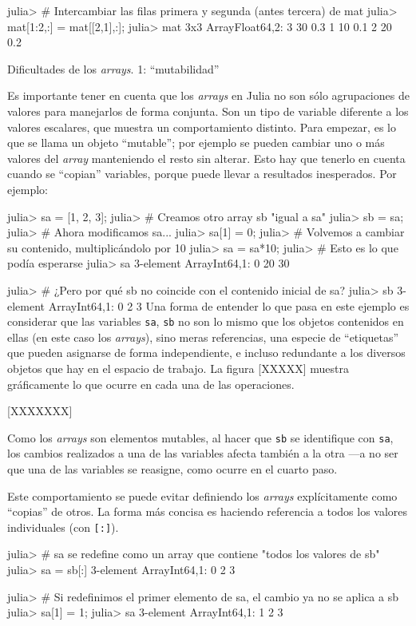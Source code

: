 ﻿\documentclass{article}
\newcommand{\code}{\texttt}
\begin{document}
julia> # Intercambiar las filas primera y segunda (antes tercera) de mat
julia> mat[1:2,:] = mat[[2,1],:];
julia> mat
3x3 Array{Float64,2}:
 3 30 0.3
 1 10 0.1
 2 20 0.2

Dificultades de los \emph{arrays}. 1: ``mutabilidad''

Es importante tener en cuenta que los \emph{arrays} en Julia no son sólo agrupaciones de valores para manejarlos de forma conjunta. Son un tipo de variable diferente a los valores escalares, que muestra un comportamiento distinto. Para empezar, es lo que se llama un objeto ``mutable''; por ejemplo se pueden cambiar uno o más valores del \emph{array} manteniendo el resto sin alterar. Esto hay que tenerlo en cuenta cuando se ``copian'' variables, porque puede llevar a resultados inesperados. Por ejemplo:

julia> sa = [1, 2, 3];
julia> # Creamos otro array sb "igual a sa"
julia> sb = sa;
julia> # Ahora modificamos sa...
julia> sa[1] = 0;
julia> # Volvemos a cambiar su contenido, multiplicándolo por 10
julia> sa = sa*10;
julia> # Esto es lo que podía esperarse
julia> sa
3-element Array{Int64,1}:
  0
 20
 30

julia> # ¿Pero por qué sb no coincide con el contenido inicial de sa?
julia> sb
3-element Array{Int64,1}:
 0
 2
 3
Una forma de entender lo que pasa en este ejemplo es considerar que las variables \code{sa}, \code{sb} no son lo mismo que los objetos contenidos en ellas (en este caso los \emph{arrays}), sino meras referencias, una especie de ``etiquetas'' que pueden asignarse de forma independiente, e incluso redundante a los diversos objetos que hay en el espacio de trabajo. La figura [XXXXX] muestra gráficamente lo que ocurre en cada una de las operaciones.

[XXXXXXX]

Como los \emph{arrays} son elementos mutables, al hacer que \code{sb} se identifique con \code{sa}, los cambios realizados a una de las variables afecta también a la otra ---a no ser que una de las variables se reasigne, como ocurre en el cuarto paso.

Este comportamiento se puede evitar definiendo los \emph{arrays} explícitamente como ``copias'' de otros. La forma más concisa es haciendo referencia a todos los valores individuales (con \code{[:]}).

julia> # sa se redefine como un array que contiene "todos los valores de sb"
julia> sa = sb[:]
3-element Array{Int64,1}:
 0
 2
 3

julia> # Si redefinimos el primer elemento de sa, el cambio ya no se aplica a sb
julia> sa[1] = 1;
julia> sa
3-element Array{Int64,1}:
 1
 2
 3
\end{document}

